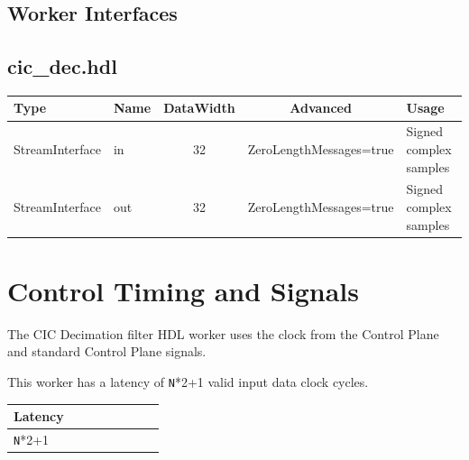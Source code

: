 \documentclass{article}
\def\comp{cic\_dec}
\begin{document}
\begin{landscape}
	\section*{Worker Interfaces}
	\subsection*{\comp.hdl}
	\begin{scriptsize}
		\begin{tabular}{|M{2cm}|M{1.5cm}|c|c|M{12cm}|}
			\hline
			Type            & Name & DataWidth & Advanced                & Usage                  \\
			\hline
			StreamInterface & in   & 32        & ZeroLengthMessages=true & Signed complex samples \\
			\hline
			StreamInterface & out  & 32        & ZeroLengthMessages=true & Signed complex samples \\
			\hline
		\end{tabular}
	\end{scriptsize}
\end{landscape}

\section*{Control Timing and Signals}
\begin{flushleft}
	The CIC Decimation filter HDL worker uses the clock from the Control Plane and standard Control Plane signals.\medskip


	This worker has a latency of \verb+N+*2+1 valid input data clock cycles.\medskip

	\begin{tabular}{|M{4.5cm}|M{4.5cm}|M{1cm}|M{1.5cm}|M{2cm}|M{1cm}|M{1cm}|M{2.5cm}|}
		\hline
		\hline
		Latency         \\
		\hline
		\verb+N+*2+1    \\
		\hline
	\end{tabular}
\end{flushleft}
\end{document}
